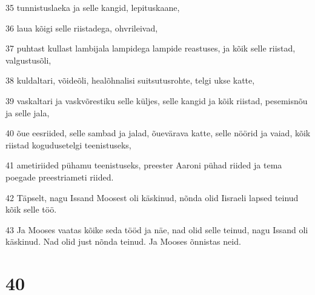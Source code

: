 \par 35 tunnistuslaeka ja selle kangid, lepituskaane,
\par 36 laua kõigi selle riistadega, ohvrileivad,
\par 37 puhtast kullast lambijala lampidega lampide reastuses, ja kõik selle riistad, valgustusõli,
\par 38 kuldaltari, võideõli, healõhnalisi suitsutusrohte, telgi ukse katte,
\par 39 vaskaltari ja vaskvõrestiku selle küljes, selle kangid ja kõik riistad, pesemisnõu ja selle jala,
\par 40 õue eesriided, selle sambad ja jalad, õuevärava katte, selle nöörid ja vaiad, kõik riistad kogudusetelgi teenistuseks,
\par 41 ametiriided pühamu teenistuseks, preester Aaroni pühad riided ja tema poegade preestriameti riided.
\par 42 Täpselt, nagu Issand Moosest oli käskinud, nõnda olid Iisraeli lapsed teinud kõik selle töö.
\par 43 Ja Mooses vaatas kõike seda tööd ja näe, nad olid selle teinud, nagu Issand oli käskinud. Nad olid just nõnda teinud. Ja Mooses õnnistas neid.

\chapter{40}


